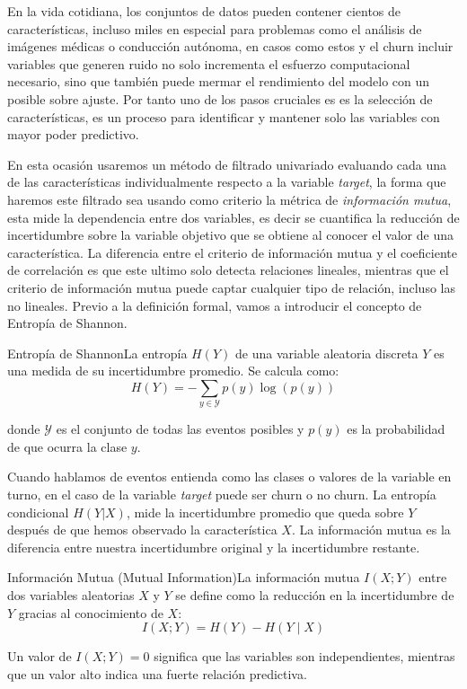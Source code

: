 En la vida cotidiana, los conjuntos de datos pueden contener cientos de características, incluso miles en especial para problemas como el análisis de imágenes médicas o conducción autónoma, en casos como estos y el churn incluir variables que generen ruido no solo incrementa el esfuerzo computacional necesario, sino que también puede mermar el rendimiento del modelo con un posible sobre ajuste. Por tanto uno de los pasos cruciales es es la selección de características, es un proceso para identificar y mantener solo las variables con mayor poder predictivo.

En esta ocasión usaremos un método de filtrado univariado evaluando cada una de las características individualmente respecto a la variable \textit{target}, la forma que haremos este filtrado sea usando como criterio la métrica de \textit{información mutua}, esta mide la dependencia entre dos variables, es decir se cuantifica la reducción de incertidumbre sobre la variable objetivo que se obtiene al conocer el valor de una característica. La diferencia entre el criterio de información mutua y el coeficiente de correlación es que este ultimo solo detecta relaciones lineales, mientras que el criterio de información mutua puede captar cualquier tipo de relación, incluso las no lineales. Previo a la definición formal, vamos a introducir el concepto de Entropía de Shannon.

\begin{definicion}{Entropía de Shannon}La entropía $H(Y)$ de una variable aleatoria discreta $Y$ es una medida de su incertidumbre promedio. Se calcula como:\[ H(Y) = -\sum_{y \in \mathcal{Y}} p(y) \log(p(y)) \]
	
	donde $\mathcal{Y}$ es el conjunto de todas las eventos posibles y $p(y)$ es la probabilidad de que ocurra la clase $y$. 
\end{definicion}

Cuando hablamos de eventos entienda como las clases o valores de la variable en turno, en el caso de la variable \textit{target} puede ser churn o no churn. La entropía condicional $H(Y|X)$, mide la incertidumbre promedio que queda sobre $Y$ después de que hemos observado la característica $X$. La información mutua es la diferencia entre nuestra incertidumbre original y la incertidumbre restante. 

\begin{definicion}{Información Mutua (Mutual Information)}La información mutua $I(X; Y)$ entre dos variables aleatorias $X$ y $Y$ se define como la reducción en la incertidumbre de $Y$ gracias al conocimiento de $X$:\[ I(X; Y) = H(Y) - H(Y \mid X) \]
	
	Un valor de $I(X; Y) = 0$ significa que las variables son independientes, mientras que un valor alto indica una fuerte relación predictiva.
\end{definicion}

